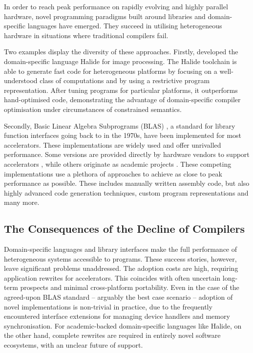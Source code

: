     In order to reach peak performance on rapidly evolving and highly parallel
    hardware, novel programming paradigms built around libraries and
    domain-specific languages have emerged.
    They succeed in utilising heterogeneous hardware in situations where
    traditional compilers fail.

    Two examples display the diversity of these approaches.
    Firstly, \citet{Ragan-Kelley2013Halide} developed the domain-specific
    language Halide for image processing.
    The Halide toolchain is able to generate fast code for heterogeneous
    platforms by focusing on a well-understood class of computations and by
    using a restrictive program representation.
    After tuning programs for particular platforms, it outperforms
    hand-optimised code, demonstrating the advantage of domain-specific compiler
    optimisation under circumstances of constrained semantics.

    Secondly, Basic Linear Algebra Subprograms (BLAS)
    \citep{2002:USB:567806.567807}, a standard for library function interfaces
    going back to \citet{Lawson:1979:BLA:355841.355847} in the 1970s, have been
    implemented for most accelerators.
    These implementations are widely used and offer unrivalled performance.
    Some versions are provided directly by hardware vendors to support
    accelerators \citep{mkl,cublas,clblas,apl,qml}, while others originate as
    academic projects \citep{Wang:2013:AAG:2503210.2503219}.
    These competing implementations use a plethora of approaches to achieve as
    close to peak performance as possible.
    These includes manually written assembly code, but also highly advanced
    code generation techniques, custom program representations and many more.

\subsection{The Consequences of the Decline of Compilers}

    Domain-specific languages and library interfaces make the full performance
    of heterogeneous systems accessible to programs.
    These success stories, however, leave significant problems unaddressed.
    The adoption costs are high, requiring application rewrites for
    accelerators.
    This coincides with often uncertain long-term prospects and minimal
    cross-platform portability.
    Even in the case of the agreed-upon BLAS standard -- arguably the best case
    scenario -- adoption of novel implementations is non-trivial in practice,
    due to the frequently encountered interface extensions for managing device
    handlers and memory synchronisation.
    For academic-backed domain-specific languages like Halide, on the other
    hand, complete rewrites are required in entirely novel software ecosystems,
    with an unclear future of support.


